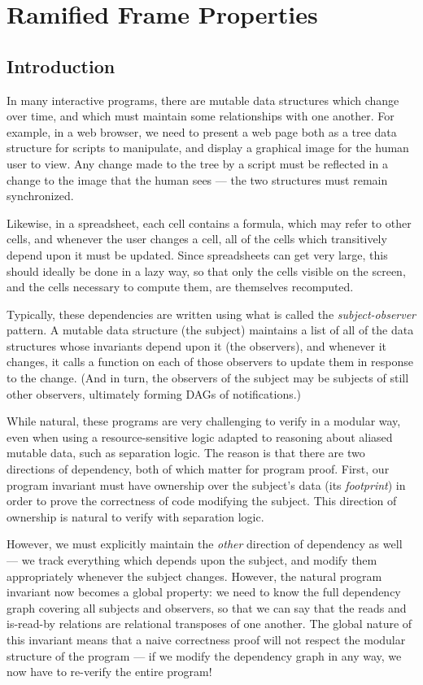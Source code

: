 \chapter{Ramified Frame Properties}

\section{Introduction}

In many interactive programs, there are mutable data structures which
change over time, and which must maintain some relationships with one
another. For example, in a web browser, we need to present a web page
both as a tree data structure for scripts to manipulate, and 
display a graphical image for the human user to view. Any change made
to the tree by a script must be reflected in a change to the image
that the human sees --- the two structures must remain synchronized.

Likewise, in a spreadsheet, each cell contains a formula, which may
refer to other cells, and whenever the user changes a cell, all of the
cells which transitively depend upon it must be updated. Since
spreadsheets can get very large, this should ideally be done in a lazy
way, so that only the cells visible on the screen, and the cells
necessary to compute them, are themselves recomputed.

Typically, these dependencies are written using what is called the
\emph{subject-observer} pattern. A mutable data structure (the
subject) maintains a list of all of the data structures whose
invariants depend upon it (the observers), and whenever it changes, it
calls a function on each of those observers to update them in response
to the change. (And in turn, the observers of the subject may be
subjects of still other observers, ultimately forming DAGs of
notifications.)

While natural, these programs are very challenging to verify in a
modular way, even when using a resource-sensitive logic adapted to
reasoning about aliased mutable data, such as separation logic. The
reason is that there are two directions of dependency, both of which
matter for program proof. First, our program invariant must have
ownership over the subject's data (its \emph{footprint}) in order to
prove the correctness of code modifying the subject. This direction
of ownership is natural to verify with separation logic. 

However, we must explicitly maintain the \emph{other} direction of
dependency as well --- we track everything which depends upon the
subject, and modify them appropriately whenever the subject changes.
However, the natural program invariant now becomes a global property:
we need to know the full dependency graph covering all subjects and
observers, so that we can say that the reads and is-read-by relations
are relational transposes of one another. The global nature of this
invariant means that a naive correctness proof will not respect the
modular structure of the program --- if we modify the dependency graph
in any way, we now have to re-verify the entire program!

